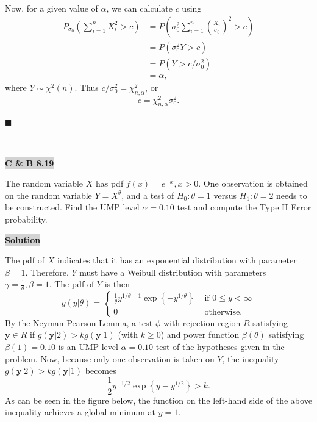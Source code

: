 \documentclass[12pt]{article}
\newcommand{\mybox}{%
    \collectbox{%
        \setlength{\fboxsep}{2pt}%
        \fbox{\BOXCONTENT}%
    }%
}
\begin{document}
Now, for a given value of $\alpha$, we can calculate $c$ using 
\begin{align}
P_{\sigma_0}\left(\sum\limits_{i=1}^n X_i^2 > c\right) &= P\left(\sigma_0^2\sum\limits_{i=1}^n \left(\frac{X_i}{\sigma_0}\right)^2 > c\right) \\
&= P\left(\sigma_0^2Y > c\right) \\
&= P\left(Y > c / \sigma_0^2\right) \\
&= \alpha,
\end{align}
where $Y \sim \chi^2(n)$. Thus $c/\sigma_0^2 = \chi^2_{n, \alpha}$, or $$c = \chi^2_{n, \alpha}\sigma_0^2.$$

\hfill$\blacksquare$

\vfill
\begin{center}
\end{center}
\begin{center}
\vspace{-0.6cm}
\hrulefill \\
\vspace{-0.7cm}
\hrulefill
\end{center}

\pagebreak

\noindent\mybox{\colorbox{lightgray}{\textbf{C \& B 8.19}}}\hspace{3mm}\hrulefill 

\noindent The random variable $X$ has pdf $f(x) = e^{-x}, x > 0$. One observation is obtained on the random variable $Y = X^\theta$, and a test of $H_0 : \theta = 1$ versus $H_1: \theta = 2$ needs to be constructed. Find the UMP level $\alpha = 0.10$ test and compute the Type II Error probability.

\vspace{3mm}

\noindent\mybox{\colorbox{lightgray}{\textbf{Solution}}} \hspace{3mm}\hrulefill

\noindent The pdf of $X$ indicates that it has an exponential distribution with parameter $\beta = 1$. Therefore, $Y$ must have a Weibull distribution with parameters $\gamma = \frac{1}{\theta}, \beta = 1$. The pdf of $Y$ is then 
$$g(y|\theta) =
\begin{cases}
\frac{1}{\theta}y^{1/\theta - 1}\exp\left\lbrace-y^{1/\theta} \right\rbrace & \text{ if } 0 \leq y < \infty \\
0 & \text{ otherwise. }
\end{cases}
$$  
By the Neyman-Pearson Lemma, a test $\phi$ with rejection region $R$ satisfying $\textbf{y} \in R$ if $g(\textbf{y}|2) > kg(\textbf{y}|1)$ (with $k\geq 0$) and power function $\beta(\theta)$ satisfying $\beta(1) = 0.10$ is an UMP level $\alpha = 0.10$ test of the hypotheses given in the problem. Now, because only one observation is taken on $Y$, the inequality $g(\textbf{y}|2) > kg(\textbf{y}|1)$ becomes $$\frac{1}{2}y^{-1/2}\exp\left\lbrace y-y^{1/2}\right\rbrace > k.$$ 
As can be seen in the figure below, the function on the left-hand side of the above inequality achieves a global minimum at $y = 1$. 
\end{document}
